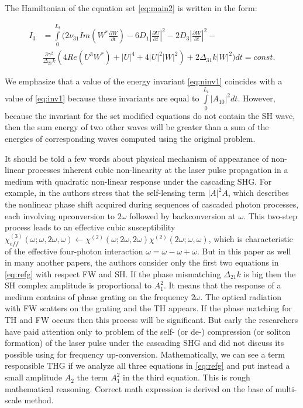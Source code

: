 \documentclass[a4paper, 12pt, onecolumn]{extarticle}
\begin{document}
The Hamiltonian of the equation set \eqref{eq:main2} is written in the form:

\begin{equation}
\label{eq:ninv3}
\begin{aligned}
I_3&=\int\limits_0^{L_t}\Big(2\nu_{31}Im\left(W^*\frac{\partial W}{\partial t}\right)-6D_1|\frac{\partial U}{\partial t}|^2-2D_3|\frac{\partial W}{\partial t}|^2-\\
&\frac{3\gamma^2}{\Delta_{21}k}\left(4Re(U^3W^*)+|U|^4+4|U|^2|W|^2\right)+2\Delta_{31}k|W|^2\Big)dt=const.
\end{aligned}
\end{equation}

We  emphasize that a value of the energy invariant \eqref{eq:ninv1} coincides with a value of  \eqref{eq:inv1} because these invariants are equal to \(\int\limits_0^{L_t}|A_{10}|^2dt\). However, because the invariant for the  set modified equations do not contain the SH wave, then the sum energy of two other waves will be greater than a sum of the energies of corresponding waves computed using the original problem.

It should be told a few words about physical mechanism of appearance of  non-linear processes inherent cubic non-linearity at the laser pulse propagation in a medium with quadratic non-linear response under the cascading SHG. For example, in  \cite{bib:n19} the authors stress that the self-lensing term $|A|^2A$, which describes the nonlinear phase shift acquired during sequences of cascaded photon processes, each involving upconversion to $2\omega$ followed by backconversion at $\omega$. This two-step process leads to an effective cubic susceptibility $\chi_{eff}^{(3)}(\omega; \omega,2\omega,\omega) \leftarrow \chi^{(2)}(\omega; 2\omega,2\omega)\chi^{(2)}(2\omega; \omega,\omega)$, which is characteristic of the effective four-photon interaction $\omega=\omega-\omega+\omega$. But in this paper as well in many another papers, the authors consider only the first two equations in \eqref{eq:refg} with respect FW and SH. If the phase mismatching $\Delta_{21}k$ is big then the SH complex amplitude is proportional to $A_1^2$. It means that the response of a medium  contains of phase grating  on the frequency $2\omega$. The optical radiation with FW scatters on the grating and the TH appears. If the phase matching for TH and FW occurs then this process will be significant. But early the researchers have paid attention only to problem of the self- (or de-) compression (or soliton formation) of the laser pulse  under the cascading SHG and did not discuss its possible using for frequency up-conversion. Mathematically, we can see a term responsible THG if we analyze all three equations in \eqref{eq:refg} and put instead a small amplitude $A_2$ the term  $A_1^2$ in the third equation. This is rough mathematical reasoning. Correct math expression is derived on the base of multi-scale method. 
\end{document}
